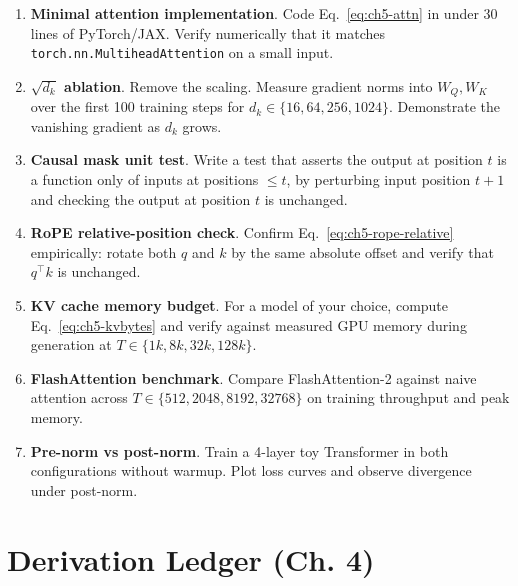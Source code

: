 \begin{enumerate}
  \item \textbf{Minimal attention implementation}. Code Eq.\,
        \eqref{eq:ch5-attn} in under 30 lines of PyTorch/JAX. Verify
        numerically that it matches \texttt{torch.nn.MultiheadAttention}
        on a small input.
  \item \textbf{$\sqrt{d_k}$ ablation}. Remove the scaling. Measure
        gradient norms into $W_Q, W_K$ over the first 100 training
        steps for $d_k \in \{16, 64, 256, 1024\}$. Demonstrate the
        vanishing gradient as $d_k$ grows.
  \item \textbf{Causal mask unit test}. Write a test that asserts the
        output at position $t$ is a function only of inputs at
        positions $\le t$, by perturbing input position $t+1$ and
        checking the output at position $t$ is unchanged.
  \item \textbf{RoPE relative-position check}. Confirm Eq.\,
        \eqref{eq:ch5-rope-relative} empirically: rotate both $q$
        and $k$ by the same absolute offset and verify that
        $q^{\top}k$ is unchanged.
  \item \textbf{KV cache memory budget}. For a model of your choice,
        compute Eq.~\eqref{eq:ch5-kvbytes} and verify against
        measured GPU memory during generation at $T \in \{1k, 8k,
        32k, 128k\}$.
  \item \textbf{FlashAttention benchmark}. Compare FlashAttention-2
        against naive attention across $T \in \{512, 2048, 8192,
        32768\}$ on training throughput and peak memory.
  \item \textbf{Pre-norm vs post-norm}. Train a 4-layer toy
        Transformer in both configurations without warmup. Plot
        loss curves and observe divergence under post-norm.
\end{enumerate}

\section*{Derivation Ledger (Ch. 4)}

